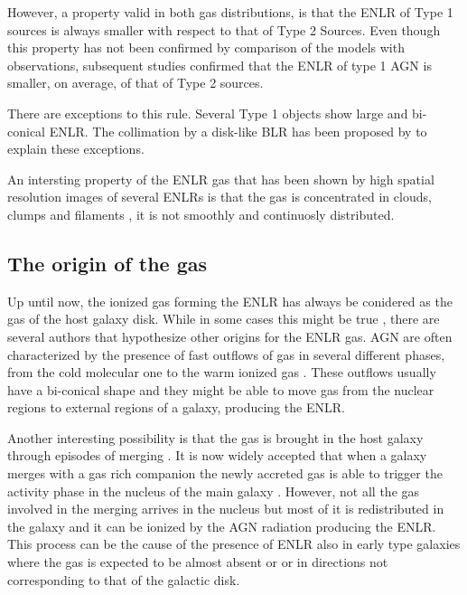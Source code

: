 \documentclass[../main.tex]{subfiles}
\begin{document}
However, a property valid in both gas distributions, is that the ENLR of Type 1 sources is always smaller with respect to that of Type 2 Sources.
Even though this property has not been confirmed by \citet{Mulchaey96b} comparison of the models with observations, subsequent studies \citep[e.g.][]{Schmitt03b} confirmed that the ENLR of type 1 AGN is smaller, on average, of that of Type 2 sources.

There are exceptions to this rule.
Several Type 1 objects \citep[e.g. NGC 4151][]{Pogge89,Evans93} show large and bi-conical ENLR.
The collimation by a disk-like BLR has been proposed by \citet{Evans93} to explain these exceptions.

An intersting property of the ENLR gas that has been shown by high spatial resolution images of several ENLRs is that the gas is concentrated in clouds, clumps and filaments \citep[e.g.][]{Tadhunter89,Mulchaey96a,Mulchaey96b,Schmitt03,Schmitt03b}, it is not smoothly and continuosly distributed.

\subsection{The origin of the gas}

Up until now, the ionized gas forming the ENLR has always be conidered as the gas of the host galaxy disk.
While in some cases this might be true \citep[e.g.][]{Fischer17}, there are several authors that hypothesize other origins for the ENLR gas.
AGN are often characterized by the presence of fast outflows of gas in several different phases, from the cold molecular one to the warm ionized gas \citep{Baldwin87,Hutchings98,Crenshaw00,Crenshaw00b,Dasyra15,Morganti15,Morganti18}.
These outflows usually have a bi-conical shape \citep{Pogge88,Schmitt94,Fischer13} and they might be able to move gas from the nuclear regions to external regions of a galaxy, producing the ENLR.

Another interesting possibility is that the gas is brought in the host galaxy through episodes of merging \citep{Veilleux99,Ciroi05,DiMille07,Cracco11}.
It is now widely accepted that when a galaxy merges with a gas rich companion the newly accreted gas is able to trigger the activity phase in the nucleus of the main galaxy \citep{Sanders88,Hong15}.
However, not all the gas involved in the merging arrives in the nucleus but most of it is redistributed in the galaxy and it can be ionized by the AGN radiation producing the ENLR.
This process can be the cause of the presence of ENLR also in early type galaxies where the gas is expected to be almost absent or or in directions not corresponding to that of the galactic disk.
\end{document}
